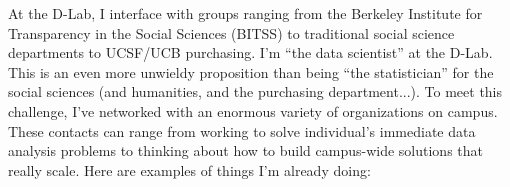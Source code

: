 




At the D-Lab, I interface with groups ranging from the Berkeley Institute for
Transparency in the Social Sciences (BITSS) to traditional social science
departments to UCSF/UCB purchasing. I'm “the data scientist” at the D-Lab. This
is an even more unwieldy proposition than being “the statistician” for the
social sciences (and humanities, and the purchasing department...). To meet this
challenge, I've networked with an enormous variety of organizations on campus.
These contacts can range from working to solve individual's immediate data
analysis problems to thinking about how to build campus-wide solutions that
really scale. Here are examples of things I'm already doing:

